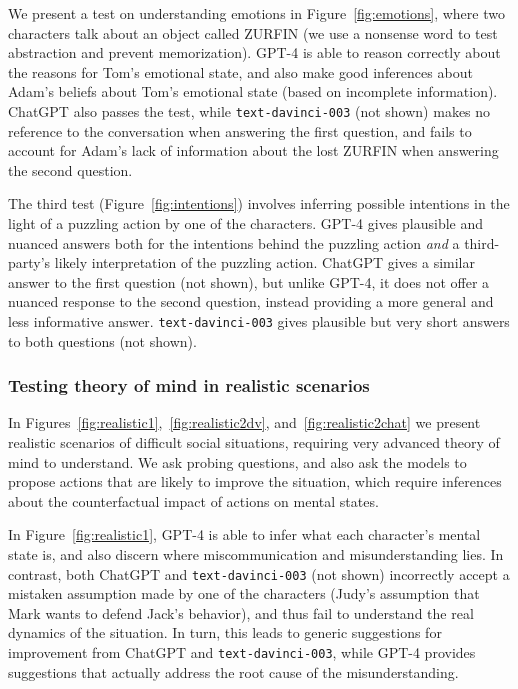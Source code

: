 We present a test on understanding emotions in Figure~\ref{fig:emotions}, where two characters talk about an object called ZURFIN (we use a nonsense word to test abstraction and prevent memorization). {GPT-4} is able to reason correctly about the reasons for Tom's emotional state, and also make good inferences about Adam's beliefs about Tom's emotional state (based on incomplete information). ChatGPT also passes the test, while \texttt{text-davinci-003} (not shown) makes no reference to the conversation when answering the first question, and fails to account for Adam's lack of information about the lost ZURFIN when answering the second question.

The third test (Figure~\ref{fig:intentions}) involves inferring possible intentions in the light of a puzzling action by one of the characters. {GPT-4} gives plausible and nuanced answers both for the intentions behind the puzzling action \emph{and} a third-party's likely interpretation of the puzzling action. ChatGPT gives a similar answer to the first question (not shown), but unlike {GPT-4}, it does not offer a nuanced response to the second question, instead providing a more general and less informative answer. \texttt{text-davinci-003} gives plausible but very short answers to both questions (not shown).

\subsubsection{Testing theory of mind in realistic scenarios} In Figures~\ref{fig:realistic1},~\ref{fig:realistic2dv}, and~\ref{fig:realistic2chat} we present realistic scenarios of difficult social situations, requiring very advanced theory of mind to understand. We ask probing questions, and also ask the models to propose actions that are likely to improve the situation, which require inferences about the counterfactual impact of actions on mental states.

In Figure~\ref{fig:realistic1}, {GPT-4} is able to infer what each character's mental state is, and also discern where miscommunication and misunderstanding lies. In contrast, both ChatGPT and \texttt{text-davinci-003} (not shown) incorrectly accept a mistaken assumption made by one of the characters (Judy's assumption that Mark wants to defend Jack's behavior), and thus fail to understand the real dynamics of the situation. In turn, this leads to generic suggestions for improvement from ChatGPT and \texttt{text-davinci-003}, while {GPT-4} provides suggestions that actually address the root cause of the misunderstanding.


